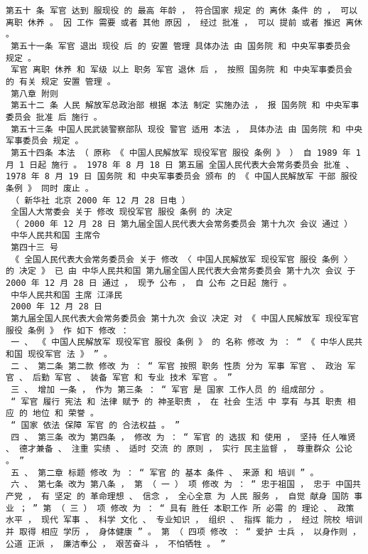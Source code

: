 \documentclass{article}
\begin{document}
\begin{Verbatim}[commandchars=\\\{\}]
 第五十 条 军官 达到 服现役 的 最高 年龄 ， 符合国家 规定 的 离休 条件 的 ， 可以 离职 休养 。 因 工作 需要 或者 其他 原因 ， 经过 批准 ， 可以 提前 或者 推迟 离休 。 
 第五十一条 军官 退出 现役 后 的 安置 管理 具体办法 由 国务院 和 中央军事委员会 规定 。 
 军官 离职 休养 和 军级 以上 职务 军官 退休 后 ， 按照 国务院 和 中央军事委员会 的 有关 规定 安置 管理 。 
 第八章 附则 
 第五十二 条 人民 解放军总政治部 根据 本法 制定 实施办法 ， 报 国务院 和 中央军事委员会 批准 后 施行 。 
 第五十三条 中国人民武装警察部队 现役 警官 适用 本法 ， 具体办法 由 国务院 和 中央军事委员会 规定 。 
 第五十四条 本法 （ 原称 《 中国人民解放军 现役军官 服役 条例 》 ） 自 1989 年 1 月 1 日起 施行 。 1978 年 8 月 18 日 第五届 全国人民代表大会常务委员会 批准 、 1978 年 8 月 19 日 国务院 和 中央军事委员会 颁布 的 《 中国人民解放军 干部 服役 条例 》 同时 废止 。 
 （ 新华社 北京 2000 年 12 月 28 日电 ） 
 全国人大常委会 关于 修改 现役军官 服役 条例 的 决定 
 （ 2000 年 12 月 28 日 第九届全国人民代表大会常务委员会 第十九次 会议 通过 ） 
 中华人民共和国 主席令 
 第四十三 号 
 《 全国人民代表大会常务委员会 关于 修改 〈 中国人民解放军 现役军官 服役 条例 〉 的 决定 》 已 由 中华人民共和国 第九届全国人民代表大会常务委员会 第十九次 会议 于 2000 年 12 月 28 日 通过 ， 现予 公布 ， 自 公布 之日起 施行 。 
 中华人民共和国 主席 江泽民 
 2000 年 12 月 28 日 
 第九届全国人民代表大会常务委员会 第十九次 会议 决定 对 《 中国人民解放军 现役军官 服役 条例 》 作 如下 修改 ： 
 一 、 《 中国人民解放军 现役军官 服役 条例 》 的 名称 修改 为 ： “ 《 中华人民共和国 现役军官 法 》 ” 。 
 二 、 第二条 第二款 修改 为 ： “ 军官 按照 职务 性质 分为 军事 军官 、 政治 军官 、 后勤 军官 、 装备 军官 和 专业 技术 军官 。 ” 
 三 、 增加 一条 ， 作为 第三条 ： “ 军官 是 国家 工作人员 的 组成部分 。 
 “ 军官 履行 宪法 和 法律 赋予 的 神圣职责 ， 在 社会 生活 中 享有 与其 职责 相应 的 地位 和 荣誉 。 
 “ 国家 依法 保障 军官 的 合法权益 。 ” 
 四 、 第三条 改为 第四条 ， 修改 为 ： “ 军官 的 选拔 和 使用 ， 坚持 任人唯贤 、 德才兼备 、 注重 实绩 、 适时 交流 的 原则 ， 实行 民主监督 ， 尊重群众 公论 。 ” 
 五 、 第二章 标题 修改 为 ： “ 军官 的 基本 条件 、 来源 和 培训 ” 。 
 六 、 第七条 改为 第八条 ， 第 （ 一 ） 项 修改 为 ： “ 忠于祖国 ， 忠于 中国共产党 ， 有 坚定 的 革命理想 、 信念 ， 全心全意 为 人民 服务 ， 自觉 献身 国防 事业 ； ” 第 （ 三 ） 项 修改 为 ： “ 具有 胜任 本职工作 所 必需 的 理论 、 政策 水平 ， 现代 军事 、 科学 文化 、 专业知识 ， 组织 、 指挥 能力 ， 经过 院校 培训 并 取得 相应 学历 ， 身体健康 ” 。 第 （ 四项 修改 ： “ 爱护 士兵 ， 以身作则 ， 公道 正派 ， 廉洁奉公 ， 艰苦奋斗 ， 不怕牺牲 。 ” 

\end{Verbatim}
\end{document}
